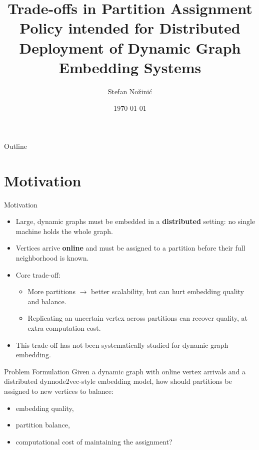 \documentclass[aspectratio=169]{beamer}
\title[Partition Assignment Trade-offs]{Trade-offs in Partition Assignment Policy intended for Distributed Deployment of Dynamic Graph Embedding Systems}
\author{Stefan Nožinić}
\institute{Seminar 3}
\date{\today}
\begin{document}
\begin{frame}
  \titlepage
\end{frame}

\begin{frame}{Outline}
  \tableofcontents
\end{frame}

\section{Motivation}

\begin{frame}{Motivation}
  \begin{itemize}
    \item Large, dynamic graphs must be embedded in a \textbf{distributed} setting: no single machine holds the whole graph.
    \item Vertices arrive \textbf{online} and must be assigned to a partition before their full neighborhood is known.
    \item Core trade-off:
    \begin{itemize}
      \item More partitions $\rightarrow$ better scalability, but can hurt embedding quality and balance.
      \item Replicating an uncertain vertex across partitions can recover quality, at extra computation cost.
    \end{itemize}
    \item This trade-off has not been systematically studied for dynamic graph embedding.
  \end{itemize}
\end{frame}

\begin{frame}{Problem Formulation}
  Given a dynamic graph with online vertex arrivals and a distributed dynnode2vec-style embedding model, how should partitions be assigned to new vertices to balance:
  \begin{itemize}
    \item embedding quality,
    \item partition balance,
    \item computational cost of maintaining the assignment?
  \end{itemize}
\end{frame}

\end{document}
